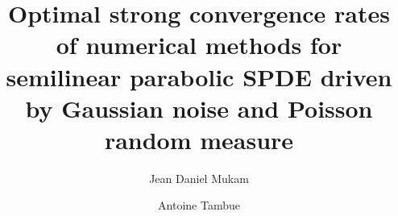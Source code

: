 \documentclass[review,12pt]{elsarticle}
\begin{document}
\begin{frontmatter}
\title{Optimal strong convergence rates of numerical methods for  semilinear parabolic SPDE driven by Gaussian noise and Poisson random measure}


\author[jdm]{Jean Daniel Mukam}
\address[jdm]{Fakult\"{a}t f\"{u}r Mathematik, Technische Universit\"{a}t Chemnitz, 09126 Chemnitz, Germany}

\author[ata,atb,atc]{Antoine Tambue}
\address[ata]{Department of Computing Mathematics and Physics,  Western Norway University of Applied Sciences, Inndalsveien 28, 5063 Bergen}
\address[atc]{Center for Research in Computational and Applied Mechanics (CERECAM), and Department of Mathematics and Applied Mathematics, University of Cape Town, 7701 Rondebosch, South Africa.}
\address[atb]{The African Institute for Mathematical Sciences(AIMS) of South Africa,
6-8 Melrose Road, Muizenberg 7945, South Africa}


%



\end{frontmatter}
\end{document}
